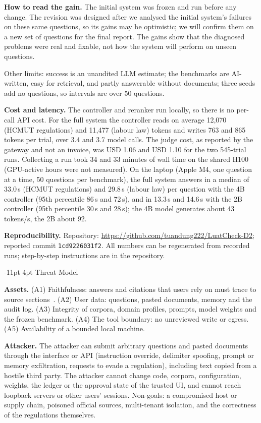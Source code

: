 \documentclass[a4paper,11pt]{article}
\makeatletter
\renewcommand\section{\@startsection{section}{1}{\z@}%
                                   {-11pt \@plus -2pt \@minus -1pt}%
                                   {4pt \@plus 1pt \@minus 1pt}%
                                   {\normalfont\large\bfseries}}
\newcommand{\hdr}[1]{\par\vspace{1.5pt}\noindent\textbf{#1}}
\makeatother
\begin{document}
\hdr{How to read the gain.} The initial system was frozen and run before any change. The revision was designed after we analysed the initial system's failures on these same questions, so its gains may be optimistic; we will confirm them on a new set of questions for the final report. The gains show that the diagnosed problems were real and fixable, not how the system will perform on unseen questions.

Other limits: success is an unaudited LLM estimate; the benchmarks are AI-written, easy for retrieval, and partly answerable without documents; three seeds add no questions, so intervals are over 50 questions.

\hdr{Cost and latency.} The controller and reranker run locally, so there is no per-call API cost. For the full system the controller reads on average 12,070 (HCMUT regulations) and 11,477 (labour law) tokens and writes 763 and 865 tokens per trial, over 3.4 and 3.7 model calls. The judge cost, as reported by the gateway and not an invoice, was USD 1.06 and USD 1.10 for the two 545-trial runs. Collecting a run took 34 and 33 minutes of wall time on the shared H100 (GPU-active hours were not measured). On the laptop (Apple M4, one question at a time, 50 questions per benchmark), the full system answers in a median of 33.0\,s (HCMUT regulations) and 29.8\,s (labour law) per question with the 4B controller (95th percentile 86\,s and 72\,s), and in 13.3\,s and 14.6\,s with the 2B controller (95th percentile 30\,s and 28\,s); the 4B model generates about 43 tokens/s, the 2B about 92.

\hdr{Reproducibility.} Repository: \url{https://github.com/tuandung222/LuatCheck-D2}; reported commit \texttt{1cd9226031f2}. All numbers can be regenerated from recorded runs; step-by-step instructions are in the repository.

\section{Threat Model}\label{sec:threat}
\hdr{Assets.} (A1) Faithfulness: answers and citations that users rely on must trace to source sections~\citep{magesh2025hallucination}. (A2) User data: questions, pasted documents, memory and the audit log. (A3) Integrity of corpora, domain profiles, prompts, model weights and the frozen benchmark. (A4) The tool boundary: no unreviewed write or egress. (A5) Availability of a bounded local machine.

\hdr{Attacker.} The attacker can submit arbitrary questions and pasted documents through the interface or API (instruction override, delimiter spoofing, prompt or memory exfiltration, requests to evade a regulation), including text copied from a hostile third party. The attacker cannot change code, corpora, configuration, weights, the ledger or the approval state of the trusted UI, and cannot reach loopback servers or other users' sessions. Non-goals: a compromised host or supply chain, poisoned official sources, multi-tenant isolation, and the correctness of the regulations themselves.
\end{document}

